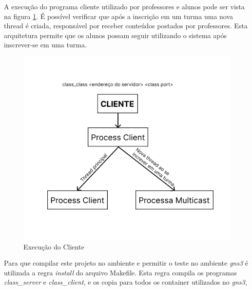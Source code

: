 \documentclass[a4paper]{article}
\begin{document}
A execução do programa cliente utilizado por professores e alunos pode ser vista na figura \ref{fig:cliente}. É possível verificar que após a inscrição em um turma uma nova thread é criada, responsável por receber conteúdos postados por professores. Esta arquitetura permite que os alunos possam seguir utilizando o sistema após inscrever-se em uma turma.

\begin{figure}
    \centering
    \includegraphics[width=0.5\linewidth]{img/Cliente.jpg}
    \caption{Execução do Cliente}
    \label{fig:cliente}
\end{figure}

Para que compilar este projeto no ambiente e permitir o teste no ambiente \textit{gns3} é utilizada a regra \textit{install} do arquivo Makefile. Esta regra compila os programas \textit{class\_server} e \textit{class\_client}, e os copia para todos os container utilizados no \textit{gns3},








\end{document}

